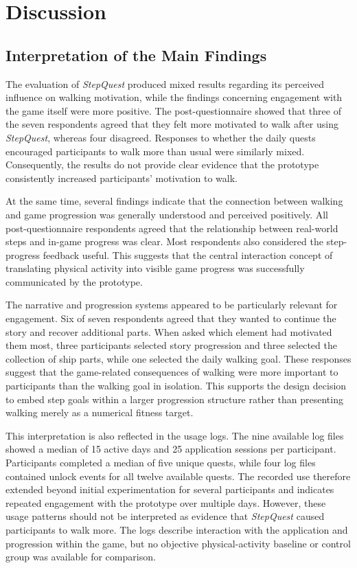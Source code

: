 \chapter{Discussion}

\section{Interpretation of the Main Findings}

The evaluation of \textit{StepQuest} produced mixed results regarding its perceived influence on walking motivation, while the findings concerning engagement with the game itself were more positive. The post-questionnaire showed that three of the seven respondents agreed that they felt more motivated to walk after using \textit{StepQuest}, whereas four disagreed. Responses to whether the daily quests encouraged participants to walk more than usual were similarly mixed. Consequently, the results do not provide clear evidence that the prototype consistently increased participants' motivation to walk.

At the same time, several findings indicate that the connection between walking and game progression was generally understood and perceived positively. All post-questionnaire respondents agreed that the relationship between real-world steps and in-game progress was clear. Most respondents also considered the step-progress feedback useful. This suggests that the central interaction concept of translating physical activity into visible game progress was successfully communicated by the prototype.

The narrative and progression systems appeared to be particularly relevant for engagement. Six of seven respondents agreed that they wanted to continue the story and recover additional parts. When asked which element had motivated them most, three participants selected story progression and three selected the collection of ship parts, while one selected the daily walking goal. These responses suggest that the game-related consequences of walking were more important to participants than the walking goal in isolation. This supports the design decision to embed step goals within a larger progression structure rather than presenting walking merely as a numerical fitness target.

This interpretation is also reflected in the usage logs. The nine available log files showed a median of 15 active days and 25 application sessions per participant. Participants completed a median of five unique quests, while four log files contained unlock events for all twelve available quests. The recorded use therefore extended beyond initial experimentation for several participants and indicates repeated engagement with the prototype over multiple days. However, these usage patterns should not be interpreted as evidence that \textit{StepQuest} caused participants to walk more. The logs describe interaction with the application and progression within the game, but no objective physical-activity baseline or control group was available for comparison.

